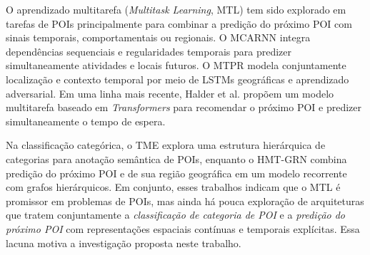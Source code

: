 O aprendizado multitarefa (\textit{Multitask Learning}, MTL) \cite{caruana1997multitask} tem sido explorado em tarefas de POIs principalmente para combinar a predição do próximo POI com sinais temporais, comportamentais ou regionais. O MCARNN \cite{Liao2018} integra dependências sequenciais e regularidades temporais para predizer simultaneamente atividades e locais futuros. O MTPR \cite{Xia2020} modela conjuntamente localização e contexto temporal por meio de LSTMs geográficas e aprendizado adversarial. Em uma linha mais recente, Halder et al. \cite{Halder2022} propõem um modelo multitarefa baseado em \textit{Transformers} para recomendar o próximo POI e predizer simultaneamente o tempo de espera.

Na classificação categórica, o TME \cite{Xu2023} explora uma estrutura hierárquica de categorias para anotação semântica de POIs, enquanto o HMT-GRN \cite{Lim2022} combina predição do próximo POI e de sua região geográfica em um modelo recorrente com grafos hierárquicos. Em conjunto, esses trabalhos indicam que o MTL é promissor em problemas de POIs, mas ainda há pouca exploração de arquiteturas que tratem conjuntamente a \textit{classificação de categoria de POI} e a \textit{predição do próximo POI} com representações espaciais contínuas e temporais explícitas. Essa lacuna motiva a investigação proposta neste trabalho.

